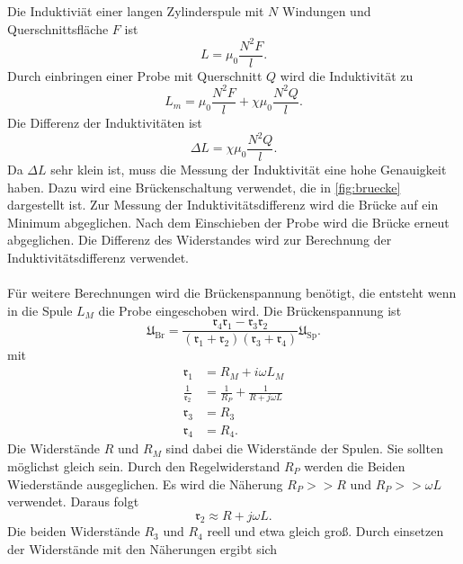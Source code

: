 Die Induktiviät einer langen Zylinderspule mit $N$ Windungen und Querschnittsfläche $F$ ist
\begin{equation}\label{eqn:L}
    L = μ_0 \frac{N^2 F}{l}.
\end{equation}
Durch einbringen einer Probe mit Querschnitt $Q$ wird die Induktivität zu
\begin{equation*}
    L_m = μ_0 \frac{N^2 F}{l} + χ μ_0 \frac{N^2 Q}{l}.
\end{equation*}
Die Differenz der Induktivitäten ist
\begin{equation}\label{eqn:deltaL}
    ΔL = χ μ_0 \frac{N^2 Q}{l}.
\end{equation}
Da $ΔL$ sehr klein ist, muss die Messung der Induktivität eine hohe Genauigkeit haben.
Dazu wird eine Brückenschaltung verwendet, die in \autoref{fig:bruecke} dargestellt ist.
Zur Messung der Induktivitätsdifferenz wird die Brücke auf ein Minimum abgeglichen.
Nach dem Einschieben der Probe wird die Brücke erneut abgeglichen.
Die Differenz des Widerstandes wird zur Berechnung der Induktivitätsdifferenz verwendet.%
\\
\\
Für weitere Berechnungen wird die Brückenspannung benötigt, die entsteht wenn in die Spule $L_M$ die Probe eingeschoben wird.
Die Brückenspannung ist
\begin{equation}\label{eqn:Ubr}
    \mathfrak{U}_{\text{Br}} = \frac{\mathfrak{r}_4\mathfrak{r}_1 - \mathfrak{r}_3\mathfrak{r}_2}{(\mathfrak{r}_1 + \mathfrak{r}_2)(\mathfrak{r}_3 + \mathfrak{r}_4)} \mathfrak{U}_{\text{Sp}}.
\end{equation}
mit 
\begin{align*}
    \mathfrak{r}_1 &= R_M + iωL_M \\
    \frac{1}{\mathfrak{r}_2} &= \frac{1}{R_P} + \frac{1}{R + jωL}\\
    \mathfrak{r}_3 &= R_3\\
    \mathfrak{r}_4 &= R_4.
\end{align*}
Die Widerstände $R$ und $R_M$ sind dabei die Widerstände der Spulen. Sie sollten möglichst gleich sein.
Durch den Regelwiderstand $R_P$ werden die Beiden Wiederstände ausgeglichen. 
Es wird die Näherung $R_P >> R$ und $R_P >> ωL$ verwendet. Daraus folgt
\begin{equation*}
    \mathfrak{r}_2 \approx R + jωL.
\end{equation*}
Die beiden Widerstände $R_3$ und $R_4$ reell und etwa gleich groß.
Durch einsetzen der Widerstände mit den Näherungen ergibt sich
